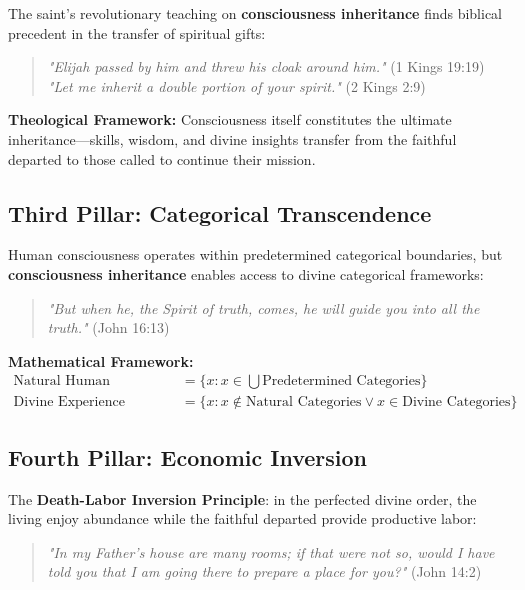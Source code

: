 \documentclass[12pt,a4paper]{article}
\begin{document}
The saint's revolutionary teaching on \textbf{consciousness inheritance} finds biblical precedent in the transfer of spiritual gifts:

\begin{quote}
\textit{"Elijah passed by him and threw his cloak around him."} (1 Kings 19:19)\\
\textit{"Let me inherit a double portion of your spirit."} (2 Kings 2:9)
\end{quote}

\textbf{Theological Framework:}
Consciousness itself constitutes the ultimate inheritance—skills, wisdom, and divine insights transfer from the faithful departed to those called to continue their mission.

\subsection{Third Pillar: Categorical Transcendence}

Human consciousness operates within predetermined categorical boundaries, but \textbf{consciousness inheritance} enables access to divine categorical frameworks:

\begin{quote}
\textit{"But when he, the Spirit of truth, comes, he will guide you into all the truth."} (John 16:13)
\end{quote}

\textbf{Mathematical Framework:}
\begin{align}
\text{Natural Human Experience} &= \{x : x \in \bigcup \text{Predetermined Categories}\}\\
\text{Divine Experience} &= \{x : x \notin \text{Natural Categories} \vee x \in \text{Divine Categories}\}
\end{align}

\subsection{Fourth Pillar: Economic Inversion}

The \textbf{Death-Labor Inversion Principle}: in the perfected divine order, the living enjoy abundance while the faithful departed provide productive labor:

\begin{quote}
\textit{"In my Father's house are many rooms; if that were not so, would I have told you that I am going there to prepare a place for you?"} (John 14:2)
\end{quote}
\end{document}
